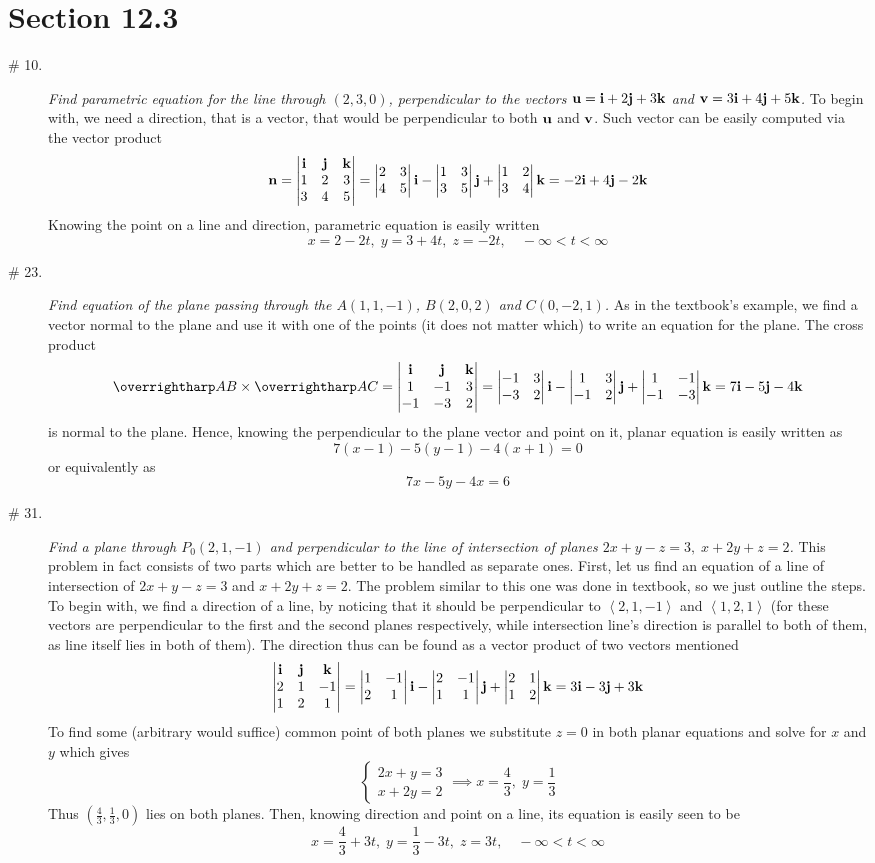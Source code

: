 \documentclass[8pt]{article} %
\begin{document}
\section{Section 12.3}
\begin{description}
	\item[\# 10.]{{\it Find parametric equation for the line through $(2,3,0)$, perpendicular to the vectors $\mathbf{u}=\mathbf{i}+
		2\mathbf{j}+3\mathbf{k}$ and $\mathbf{v}=3\mathbf{i}+4\mathbf{j}+5\mathbf{k}$.
		}
		To begin with, we need a direction, that is a vector, that would be perpendicular to both $\mathbf{u}$ and $\mathbf{v}$. Such vector
		can be easily computed via the vector product
		\[\mathbf{n}=\begin{vmatrix}\mathbf{i}&\mathbf{j}&\mathbf{k}\\1&2&3\\3&4&5\end{vmatrix}= \begin{vmatrix}2&3\\4&5\end{vmatrix}\mathbf{i} -\begin{vmatrix}1&3\\3&5\end{vmatrix}\mathbf{j} +\begin{vmatrix}1&2\\3&4\end{vmatrix}\mathbf{k}=-2\mathbf{i}+4\mathbf{j}-2\mathbf{k}\]
		Knowing the point on a line and direction, parametric equation is easily written
		\[x=2-2t,\;y=3+4t,\;z=-2t,\quad-\infty<t<\infty\]
		}
	\item[\# 23.]{{\it Find equation of the plane passing through the $A(1,1,-1)$, $B(2,0,2)$ and $C(0,-2,1)$.
		}
		As in the textbook's example, we find a vector normal to the plane and use it with one of the points (it does
		not matter which) to write an equation for the plane.
		The cross product
		\[\myvec{AB}\times\myvec{AC}=\myvecprodexpanded{1}{-1}{3}{-1}{-3}{2}=7\i-5\j-4\k\]
		is normal to the plane. Hence, knowing the perpendicular to the plane vector and point on it, planar equation is easily written as
		\[7(x-1)-5(y-1)-4(x+1)=0\]or equivalently as\[7x-5y-4x=6\]
		}
	\item[\# 31.]{{\it Find a plane through $P_0(2,1,-1)$ and perpendicular to the line of intersection of planes $2x+y-z=3,\;
		x+2y+z=2$.
		}
		This problem in fact consists of two parts which are better to be handled as separate ones. First, let us find an equation of a line
		of intersection of $2x+y-z=3$ and $x+2y+z=2$. The problem similar to this one was done in textbook, so we just outline the steps.
		To begin with, we find a direction of a line, by noticing that it should be perpendicular to $\left<2,1,-1\right>$ and
		$\left<1,2,1\right>$ (for these vectors are perpendicular to the first and the second planes
		respectively, while intersection line's direction is parallel to both of them, as line itself lies in both of them). The
		direction thus can be found as a vector product of two vectors mentioned
		\[\begin{vmatrix}\mathbf{i}&\mathbf{j}&\mathbf{k}\\2&1&-1\\1&2&1\end{vmatrix}= \begin{vmatrix}1&-1\\2&1\end{vmatrix}\mathbf{i} -\begin{vmatrix}2&-1\\1&1\end{vmatrix}\mathbf{j} +\begin{vmatrix}2&1\\1&2\end{vmatrix}\mathbf{k}=3\mathbf{i}-3\mathbf{j}+3\mathbf{k}\]
		To find some (arbitrary would suffice) common point of both planes we substitute $z=0$ in both planar equations and solve for $x$
		and $y$ which gives
		\[\begin{cases}2x+y=3\\x+2y=2\end{cases}\implies x=\frac{4}{3},\;y=\frac{1}{3}\]
		Thus $\left(\frac{4}{3},\frac{1}{3},0\right)$ lies on both planes. Then, knowing direction and point on a line, its equation is
		easily seen to be
		\[x=\frac{4}{3}+3t,\;y=\frac{1}{3}-3t,\;z=3t,\quad -\infty<t<\infty\]

}
\end{description}
\end{document}
